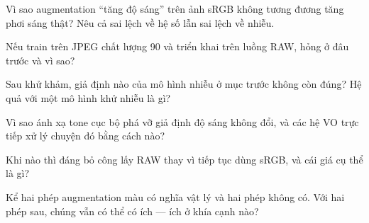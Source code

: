 \documentclass[../../../deep_learning.tex]{subfiles}
\begin{document}
\begin{tukiem}
\item Vì sao augmentation ``tăng độ sáng'' trên ảnh sRGB không tương đương tăng phơi sáng thật? Nêu cả sai lệch về hệ số lẫn sai lệch về nhiễu.
\item Nếu train trên JPEG chất lượng 90 và triển khai trên luồng RAW, hỏng ở đâu trước và vì sao?
\item Sau khử khảm, giả định nào của mô hình nhiễu ở mục trước không còn đúng? Hệ quả với một mô hình khử nhiễu là gì?
\item Vì sao ánh xạ tone cục bộ phá vỡ giả định độ sáng không đổi, và các hệ VO trực tiếp xử lý chuyện đó bằng cách nào?
\item Khi nào thì đáng bỏ công lấy RAW thay vì tiếp tục dùng sRGB, và cái giá cụ thể là gì?
\item Kể hai phép augmentation màu có nghĩa vật lý và hai phép không có. Với hai phép sau, chúng vẫn có thể có ích --- ích ở khía cạnh nào?
\end{tukiem}
\ifSubfilesClassLoaded{\printbibliography[title={Nguồn}]}{}
\end{document}
